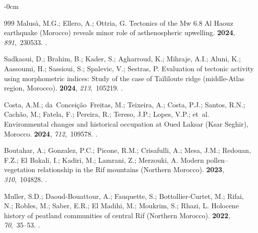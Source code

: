 \documentclass[geomatics,article,accept,pdftex,oneauthor]{Definitions/mdpi}
\begin{document}
\begin{adjustwidth}{-\extralength}{0cm}
\begin{thebibliography}{999}
Malusà, M.G.; Ellero, A.; Ottria, G.
\newblock Tectonics of the Mw 6.8 Al Haouz earthquake (Morocco) reveals minor
  role of asthenospheric upwelling.
 {\bf 2024}, {\em 891},~230533.
.

Sadkaoui, D.; Brahim, B.; Kader, S.; Agharroud, K.; Mihraje, A.I.; Aluni, K.;
  Aassoumi, H.; Sassioui, S.; Spalevic, V.; Sestras, P.
\newblock Evaluation of tectonic activity using morphometric indices: Study of
  the case of Taïliloute ridge (middle-Atlas region, Morocco).
 {\bf 2024}, {\em
  213},~105219.
.

Costa, A.M.; da~Conceição~Freitas, M.; Teixeira, A.; Costa, P.J.; Santos,
  R.N.; Cachão, M.; Fatela, F.; Pereira, R.; Tereso, J.P.; Lopes, V.P.;
  et~al.
\newblock Environmental changes and historical occupation at Oued Laksar (Ksar
  Seghir), Morocco.
 {\bf 2024}, {\em 712},~109578.
.

Boutahar, A.; Gonzalez, P.C.; Picone, R.M.; Crisafulli, A.; Mesa, J.M.;
  Redouan, F.Z.; {El Bakali}, I.; Kadiri, M.; Lamrani, Z.; Merzouki, A.
\newblock Modern pollen–vegetation relationship in the Rif mountains
  (Northern Morocco).
 {\bf 2023}, {\em
  310},~104828.
.

Muller, S.D.; Daoud-Bouattour, A.; Fauquette, S.; Bottollier-Curtet, M.; Rifai,
  N.; Robles, M.; Saber, E.R.; {El Madihi}, M.; Moukrim, S.; Rhazi, L.
\newblock Holocene history of peatland communities of central Rif (Northern
  Morocco).
 {\bf 2022}, {\em 70},~35--53.
.


\end{thebibliography}
\end{adjustwidth}
\end{document}
